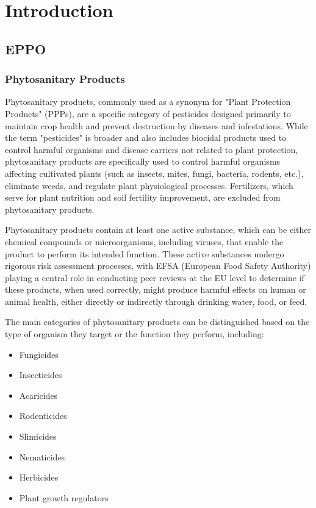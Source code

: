 \documentclass[12pt,a4paper,oneside]{report}
\begin{document}


\tableofcontents
\newpage

\chapter{Introduction}

\section{EPPO}
\subsection{Phytosanitary Products}

Phytosanitary products, commonly used as a synonym for "Plant Protection Products" (PPPs),
are a specific category of pesticides designed primarily to maintain crop health 
and prevent destruction by diseases and infestations. While the term "pesticides" 
is broader and also includes biocidal products used to control harmful organisms 
and disease carriers not related to plant protection, phytosanitary products are 
specifically used to control harmful organisms affecting cultivated plants (such 
as insects, mites, fungi, bacteria, rodents, etc.), eliminate weeds, and regulate 
plant physiological processes. Fertilizers, which serve for plant nutrition and 
soil fertility improvement, are excluded from phytosanitary products.

Phytosanitary products contain at least one active substance, which can be either 
chemical compounds or microorganisms, including viruses, that enable the product 
to perform its intended function. These active substances undergo rigorous risk 
assessment processes, with EFSA (European Food Safety Authority) playing a central 
role in conducting peer reviews at the EU level to determine if these products, 
when used correctly, might produce harmful effects on human or animal health, either 
directly or indirectly through drinking water, food, or feed.

The main categories of phytosanitary products can be distinguished based on the 
type of organism they target or the function they perform, including:


\begin{itemize}
    \item Fungicides
    \item Insecticides
    \item Acaricides
    \item Rodenticides
    \item Slimicides
    \item Nematicides
    \item Herbicides
    \item Plant growth regulators
\end{itemize}
\end{document}

